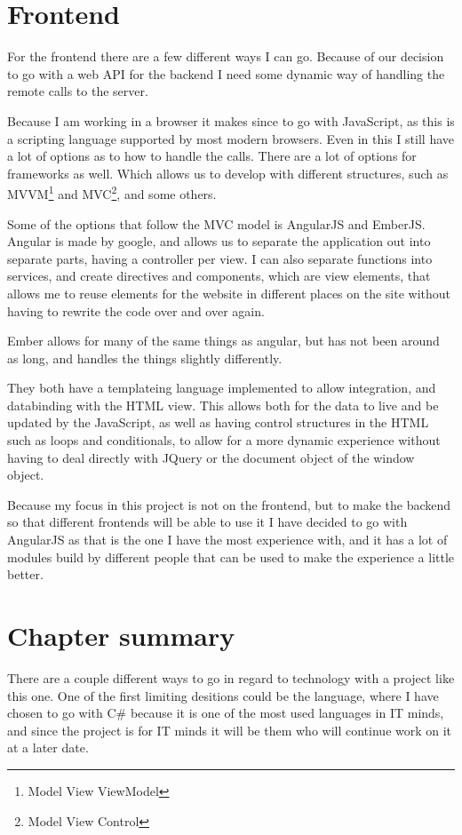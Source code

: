 \section{Frontend}
\label{sec:Frontend}
For the frontend there are a few different ways I can go. Because of our decision to go with a web API for the backend I need some dynamic way of handling the remote calls to the server.

Because I am working in a browser it makes since to go with JavaScript, as this is a scripting language supported by most modern browsers. Even in this I still have a lot of options as to how to handle the calls. There are a lot of options for frameworks as well. Which allows us to develop with different structures, such as MVVM\footnote{Model View ViewModel} and MVC\footnote{Model View Control}, and some others.

Some of the options that follow the MVC model is AngularJS and EmberJS. Angular
is made by google\cite{angularjs}, and allows us to separate the application out
into separate parts, having a controller per view. I can also separate functions
into services, and create directives and components, which are view elements, that allows me to reuse elements for the website in different places on the site without having to rewrite the code over and over again.

Ember allows for many of the same things as angular, but has not been around as long, and handles the things slightly differently\cite{emberjs}.

They both have a templateing language implemented to allow integration, and databinding with the HTML view. This allows both for the data to live and be updated by the JavaScript, as well as having control structures in the HTML such as loops and conditionals, to allow for a more dynamic experience without having to deal directly with JQuery or the document object of the window object.

Because my focus in this project is not on the frontend, but to make the backend so that different frontends will be able to use it I have decided to go with AngularJS as that is the one I have the most experience with, and it has a lot of modules build by different people that can be used to make the experience a little better.

\section{Chapter summary }
There are a couple different ways to go in regard to technology with a project
like this one. One of the first limiting desitions could be the language, where
I have chosen to go with C\# because it is one of the most used languages in IT
minds, and since the project is for IT minds it will be them who will continue
work on it at a later date. 


